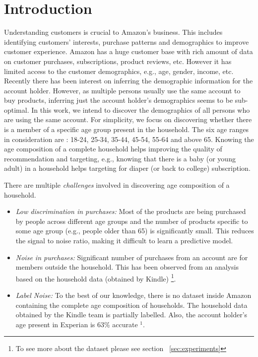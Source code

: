 \section{Introduction}
Understanding customers is crucial to Amazon's business. This includes identifying customers' interests, purchase patterns and demographics to improve customer experience. Amazon has a huge customer base with rich amount of data on customer purchases, subscriptions, product reviews, etc. However it has limited access to the customer demographics, e.g., age, gender, income, etc. Recently there has been interest on inferring the demographic information for the account holder. However, as multiple persons usually use the same account to buy products, inferring just the account holder's demographics seems to be sub-optimal. 
In this work, we intend to discover the demographics of all persons who are using the same account. 
For simplicity, we focus on discovering whether there is a member of a specific age group present in the household.
The six age ranges in consideration are : 18-24, 25-34, 35-44, 45-54, 55-64 and above 65.
Knowing the age composition of a complete household helps improving the quality of recommendation and targeting, e.g., knowing that there is a baby (or young adult) in a household helps targeting for diaper (or back to college) subscription.

There are multiple \textit{challenges} involved in discovering age composition of a household.
\begin{itemize}
\item \textit{Low discrimination in purchases:} 
Most of the products are being purchased by people across different age groups and the number of products specific to some age group (e.g., people older than 65) is significantly small. This reduces the signal to noise ratio, making it difficult to learn a predictive model. 
\item \textit{Noise in purchases:} Significant number of purchases from an account are for members outside the household. This has been observed from an analysis based on the household data (obtained by Kindle) \footnote{\label{note1}To see more about the dataset please see section ~\ref{sec:experiments}}.
\item \textit{Label Noise:} To the best of our knowledge, there is no dataset inside Amazon containing the complete age composition of households. The household data obtained by the Kindle team is partially labelled. Also, the account holder's age present in Experian is 63\% accurate $^{1}$. 
\end{itemize}

